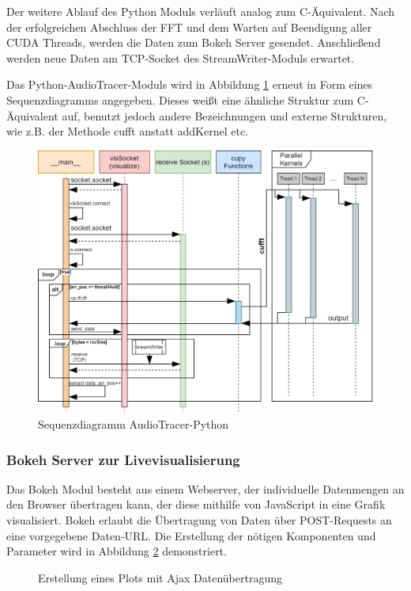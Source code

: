 Der weitere Ablauf des Python Moduls verläuft analog zum C-Äquivalent. Nach der erfolgreichen Abschluss der FFT und dem Warten auf Beendigung aller CUDA Threads, werden die Daten zum Bokeh Server gesendet. Anschließend werden neue Daten am TCP-Socket des StreamWriter-Moduls erwartet.

Das Python-AudioTracer-Moduls wird in Abbildung \ref{fig:Seq_AudioTracer_python} erneut in Form eines Sequenzdiagramms angegeben. Dieses weißt eine ähnliche Struktur zum C-Äquivalent auf, benutzt jedoch andere Bezeichnungen und externe Strukturen, wie z.B. der Methode cufft anstatt addKernel etc.

\begin{figure}[hbt!]
	\centering      
	\includegraphics[scale=0.46, angle=-90]{figures/AudioTracerPython_sequence_diagram.png}
	\caption{Sequenzdiagramm AudioTracer-Python}
	\label{fig:Seq_AudioTracer_python}
\end{figure}
\newpage
\subsubsection{Bokeh Server zur Livevisualisierung}
\label{sec:bokeh}
Das Bokeh Modul besteht aus einem Webserver, der individuelle Datenmengen an den Browser übertragen kann, der diese mithilfe von JavaScript in eine Grafik visualisiert. Bokeh erlaubt die Übertragung von Daten über POST-Requests an eine vorgegebene Daten-URL. Die Erstellung der nötigen Komponenten und Parameter wird in Abbildung \ref{fig:bokehPlot} demonstriert.

\begin{figure}[h!]
	
	\caption{Erstellung eines Plots mit Ajax Datenübertragung}
	\label{fig:bokehPlot}
\end{figure}

